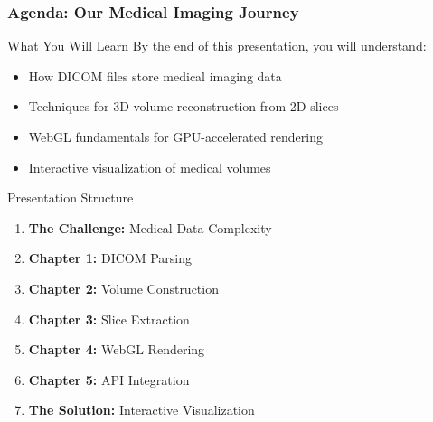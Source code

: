 \begin{frame}
\frametitle{Agenda: Our Medical Imaging Journey}

\begin{alertblock}{What You Will Learn}
By the end of this presentation, you will understand:
\begin{itemize}
  \item How DICOM files store medical imaging data
  \item Techniques for 3D volume reconstruction from 2D slices
  \item WebGL fundamentals for GPU-accelerated rendering
  \item Interactive visualization of medical volumes
\end{itemize}
\end{alertblock}
\end{frame}

\begin{frame}
\begin{block}{Presentation Structure}
\begin{enumerate}
  \item \textbf{The Challenge:} Medical Data Complexity
  \item \textbf{Chapter 1:} DICOM Parsing
  \item \textbf{Chapter 2:} Volume Construction
  \item \textbf{Chapter 3:} Slice Extraction
  \item \textbf{Chapter 4:} WebGL Rendering
  \item \textbf{Chapter 5:} API Integration
  \item \textbf{The Solution:} Interactive Visualization
\end{enumerate}
\end{block}
\end{frame}